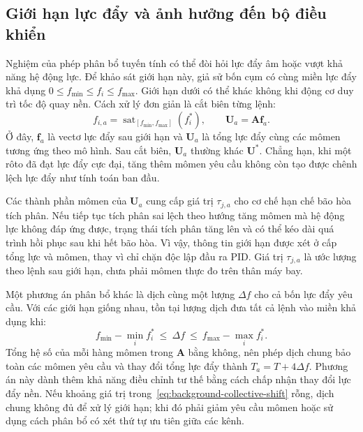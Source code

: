 \subsection{Giới hạn lực đẩy và ảnh hưởng đến bộ điều khiển}

Nghiệm của phép phân bổ tuyến tính có thể đòi hỏi lực đẩy âm hoặc vượt khả năng hệ động lực. Để khảo sát giới hạn này, giả sử bốn cụm có cùng miền lực đẩy khả dụng $0\leq f_{\min}\leq f_i\leq f_{\max}$. Giới hạn dưới có thể khác không khi động cơ duy trì tốc độ quay nền. Cách xử lý đơn giản là cắt biên từng lệnh:
\begin{equation}
	f_{i,a}=\operatorname{sat}_{[f_{\min},f_{\max}]}(f_i^*),
	\qquad \mathbf U_a=\mathbf A\mathbf f_a.
	\label{eq:background-allocation-saturation}
\end{equation}
Ở đây, $\mathbf f_a$ là vectơ lực đẩy sau giới hạn và $\mathbf U_a$ là tổng lực đẩy cùng các mômen tương ứng theo mô hình. Sau cắt biên, $\mathbf U_a$ thường khác $\mathbf U^*$. Chẳng hạn, khi một rôto đã đạt lực đẩy cực đại, tăng thêm mômen yêu cầu không còn tạo được chênh lệch lực đẩy như tính toán ban đầu.

Các thành phần mômen của $\mathbf U_a$ cung cấp giá trị $\tau_{j,a}$ cho cơ chế hạn chế bão hòa tích phân. Nếu tiếp tục tích phân sai lệch theo hướng tăng mômen mà hệ động lực không đáp ứng được, trạng thái tích phân tăng lên và có thể kéo dài quá trình hồi phục sau khi hết bão hòa. Vì vậy, thông tin giới hạn được xét ở cấp tổng lực và mômen, thay vì chỉ chặn độc lập đầu ra PID. Giá trị $\tau_{j,a}$ là ước lượng theo lệnh sau giới hạn, chưa phải mômen thực đo trên thân máy bay.

Một phương án phân bổ khác là dịch cùng một lượng $\Delta f$ cho cả bốn lực đẩy yêu cầu. Với các giới hạn giống nhau, tồn tại lượng dịch đưa tất cả lệnh vào miền khả dụng khi:
\begin{equation}
	f_{\min}-\min_i f_i^*\ \leq\ \Delta f\ \leq\
	f_{\max}-\max_i f_i^*.
	\label{eq:background-collective-shift}
\end{equation}
Tổng hệ số của mỗi hàng mômen trong $\mathbf A$ bằng không, nên phép dịch chung bảo toàn các mômen yêu cầu và thay đổi tổng lực đẩy thành $T_a=T+4\Delta f$. Phương án này dành thêm khả năng điều chỉnh tư thế bằng cách chấp nhận thay đổi lực đẩy nền. Nếu khoảng giá trị trong~\eqref{eq:background-collective-shift} rỗng, dịch chung không đủ để xử lý giới hạn; khi đó phải giảm yêu cầu mômen hoặc sử dụng cách phân bổ có xét thứ tự ưu tiên giữa các kênh.

